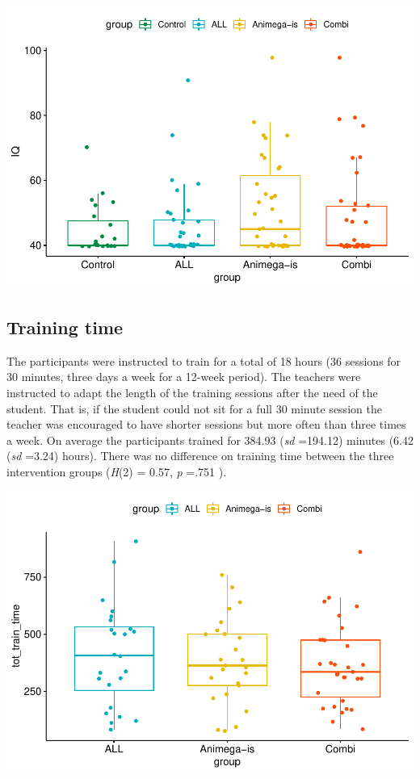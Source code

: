 \documentclass[
  english,
  ,man]{apa6}
\begin{document}
\includegraphics{Effects_of_training_files/figure-latex/IQ-plot-1.pdf}

\hypertarget{training-time-1}{%
\subsection{Training time}\label{training-time-1}}

The participants were instructed to train for a total of 18 hours (36 sessions for 30 minutes, three days a week for a 12-week period). The teachers were instructed to adapt the length of the training sessions after the need of the student. That is, if the student could not sit for a full 30 minute session the teacher was encouraged to have shorter sessions but more often than three times a week. On average the participants trained for 384.93 (\emph{sd} =194.12) minutes (6.42 (\emph{sd} =3.24) hours). There was no difference on training time between the three intervention groups (\emph{H}(2) = 0.57, \emph{p} =.751 ).

\includegraphics{Effects_of_training_files/figure-latex/tottraintime-plot-1.pdf}
\end{document}
